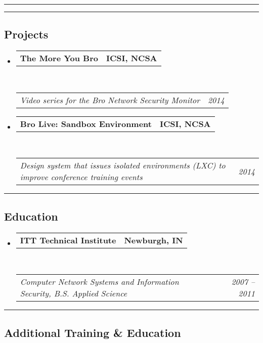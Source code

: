 \documentclass[10pt,letterpaper]{article}
\makeatletter
\newcommand{\headerrow}[2]
{\begin{tabular*}{\linewidth}{l@{\extracolsep{\fill}}r}
	#1 &
	#2 \\
\end{tabular*}}
\makeatother
\begin{document}
\hrule

\newpage

\hrule

\subsection*{Projects}

\begin{itemize}
	\parskip=0.1em

	\item
	\headerrow
		{\textbf{The More You Bro}}
		{\textbf{ICSI, NCSA}}
	\\
	\headerrow
		{\emph{Video series for the Bro Network Security Monitor}}
		{\emph{2014}}

	\item
	\headerrow
		{\textbf{Bro Live: Sandbox Environment}}
		{\textbf{ICSI, NCSA}}
	\\
	\headerrow
		{\emph{Design system that issues isolated environments (LXC) to improve conference training events}}
		{\emph{2014}}

\end{itemize}

\hrule
\vspace{-0.4em}
\subsection*{Education}

\begin{itemize}
	\parskip=0.1em

	\item
	\headerrow
		{\textbf{ITT Technical Institute}}
		{\textbf{Newburgh, IN}}
	\\
	\headerrow
		{\emph{Computer Network Systems and Information Security, B.S. Applied Science}}
		{\emph{2007 -- 2011}}

\end{itemize}

\hrule
\vspace{-0.4em}

\subsection*{Additional Training \& Education}
\end{document}
